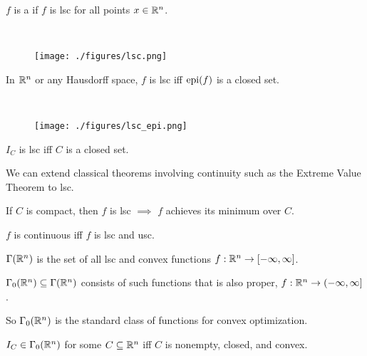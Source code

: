 \documentclass[class=article,crop=false]{standalone}
\begin{document}
\begin{defn}
$ f$ is a  if $ f$ is lsc for all points  $ x \in \mathbb{R}^{n}$. 
\end{defn}
~\begin{figure}[H]
	\centering
	\texttt{[image: ./figures/lsc.png]}
\end{figure}
\begin{thm}
	In $ \mathbb{R}^{n}$ or any Hausdorff space, $ f$ is lsc iff $ \operatorname{epi}(f)$ is a closed set. 
\end{thm}

~\begin{figure}[H]
	\centering
	\texttt{[image: ./figures/lsc\_epi.png]}
\end{figure}

\begin{eg}
$ I_C$ is lsc iff  $ C$ is a closed set.
\end{eg}

We can extend classical theorems involving continuity such as the Extreme Value Theorem to lsc.
\begin{thm}
If $ C$ is compact, then  $ f$ is lsc  $ \implies$ $ f$ achieves its minimum over  $ C$.
\end{thm}

\begin{remark}
$ f$ is continuous iff  $ f$ is lsc and usc.
\end{remark}
\begin{notation}
	$ \Gamma(\mathbb{R}^{n})$ is the set of all lsc and convex functions $ f: \mathbb{R}^{n} \to [-\infty,\infty]$.

	$ \Gamma_0 (\mathbb{R}^{n}) \subseteq \Gamma (\mathbb{R}^{n})$ consists of such functions that is also proper, $ f: \mathbb{R}^{n} \to (-\infty,\infty]$.

	So $ \Gamma_0(\mathbb{R}^{n})$ is the standard class of functions for convex optimization.
\end{notation}

\begin{eg}
	$ I_C \in \Gamma_0 (\mathbb{R}^{n})$ for some $ C \subseteq \mathbb{R}^{n}$ iff $ C$ is nonempty, closed, and convex.
\end{eg}
\end{document}
